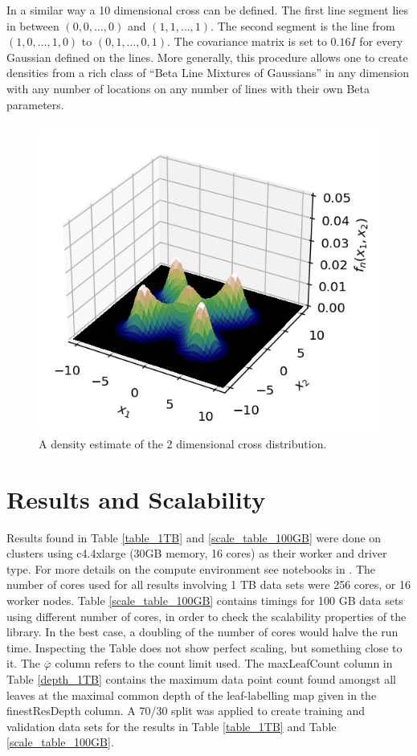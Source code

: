 \documentclass{report}
\begin{document}
In a similar way a 10 dimensional cross can be defined. The first line segment lies in between $(0,0,\dots,0)$ and $(1,1,\dots,1)$. The second segment is the line from $(1,0,\dots,1,0)$ to
$(0, 1, \dots, 0, 1)$. The covariance matrix is set to $0.16I$ for every Gaussian defined on the lines. More generally, this procedure allows one to create densities from a rich class of ``Beta Line Mixtures of Gaussians'' in any dimension with any number of locations on any number of lines with their own Beta parameters.

\begin{figure}

\hspace*{1cm}
	\includegraphics[width=0.8\linewidth]{density.png}
	\caption{A density estimate of the 2 dimensional cross distribution.}
	\label{density_estimate_100GB}
\end{figure}

\section{Results and Scalability}
Results found in Table \ref{table_1TB} and \ref{scale_table_100GB}  were done on clusters using c4.4xlarge (30GB memory, 16 cores) as their worker and driver type. For more details on the compute 
environment see notebooks in \cite{SparkDensityTreeExamples}.
The number of cores used for all results involving 1 TB data sets were 256 cores, or 16 worker nodes.
Table \ref{scale_table_100GB}
contains timings for 100 GB data sets using different number of cores, in order to check the scalability properties
of the library. In the best case, a doubling of the number of cores would halve the run time. Inspecting the Table does not show perfect scaling, but something close to it. The $\overline{\varphi}$ column refers to the count limit used. The maxLeafCount column in Table \ref{depth_1TB} contains the 
maximum data point count found amongst all leaves at the maximal common depth of the leaf-labelling map given in the finestResDepth column. A 70/30 split was applied to create training and validation data sets for the results in Table \ref{table_1TB} and Table \ref{scale_table_100GB}.
\end{document}
